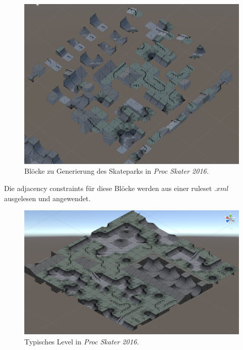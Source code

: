 \documentclass[12pt, a4paper,twoside,openright]{report} %
\begin{document}
\begin{figure}[H]
    \centering
    \includegraphics[width=1\linewidth]{images/proc-skater-ruleset.png}%
    \caption{Blöcke zu Generierung des Skateparks in \textit{Proc Skater 2016.} \cite{procskater2016}}%
\end{figure}

Die adjacency constraints für diese Blöcke werden aus einer ruleset $.xml$ ausgelesen und angewendet.

\begin{figure}[H]
    \centering
    \includegraphics[width=1\linewidth]{images/proc-skate-level.png}%
    \caption{Typisches Level in \textit{Proc Skater 2016.} \cite{procskater2016}}%
\end{figure}
\end{document}
